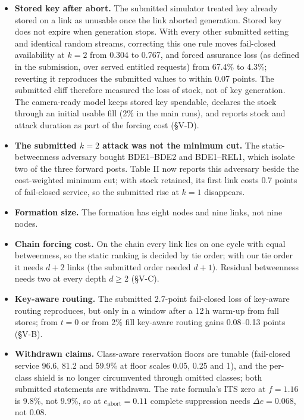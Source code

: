\documentclass[10pt,a4paper]{article}
\begin{document}
\begin{itemize}
\item \textbf{Stored key after abort.} The submitted simulator treated key already
stored on a link as unusable once the link aborted generation. Stored key does not
expire when generation stops. With every other submitted setting and identical random
streams, correcting this one rule moves fail-closed availability at $k=2$ from 0.304
to 0.767, and forced assurance loss (as defined in the submission, over served
entitled requests) from 67.4\% to 4.3\%; reverting it reproduces the submitted values
to within 0.07 points. The submitted cliff therefore measured the loss of stock, not
of key generation. The camera-ready model keeps stored key spendable, declares the
stock through an initial usable fill (2\% in the main runs), and reports stock and
attack duration as part of the forcing cost (\S V-D).
\item \textbf{The submitted $k=2$ attack was not the minimum cut.} The static-betweenness adversary bought BDE1--BDE2 and BDE1--REL1, which isolate two of the
three forward posts. Table II now reports this adversary beside the cost-weighted
minimum cut; with stock retained, its first link costs 0.7 points of fail-closed
service, so the submitted rise at $k=1$ disappears.
\item \textbf{Formation size.} The formation has eight nodes and nine links, not
nine nodes.
\item \textbf{Chain forcing cost.} On the chain every link lies on one cycle with
equal betweenness, so the static ranking is decided by tie order; with our tie
order it needs $d+2$ links (the submitted order needed $d+1$). Residual betweenness
needs two at every depth $d\ge2$ (\S V-C).
\item \textbf{Key-aware routing.} The submitted 2.7-point fail-closed loss of
key-aware routing reproduces, but only in a window after a 12\,h warm-up from full
stores; from $t=0$ or from 2\% fill key-aware routing gains 0.08--0.13 points
(\S V-B).
\item \textbf{Withdrawn claims.} Class-aware reservation floors are tunable
(fail-closed service 96.6, 81.2 and 59.9\% at floor scales 0.05, 0.25 and 1), and the
per-class shield is no longer circumvented through omitted classes; both submitted
statements are withdrawn. The rate formula's ITS zero at $f=1.16$ is 9.8\%, not
9.9\%, so at $e_{\mathrm{abort}}=0.11$ complete suppression needs $\Delta e=0.068$,
not 0.08.
\end{itemize}
\end{document}

